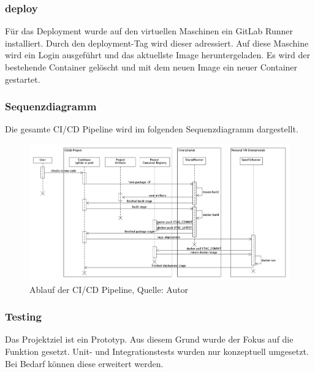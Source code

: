 \subsubsection{deploy}
Für das Deployment wurde auf den virtuellen Maschinen ein GitLab Runner installiert. Durch den deployment-Tag wird dieser adressiert. Auf diese Maschine wird ein Login ausgeführt und das aktuellste Image heruntergeladen. Es wird der bestehende Container gelöscht und mit dem neuen Image ein neuer Container gestartet. 
\newpage
\subsubsection{Sequenzdiagramm}
Die gesamte CI/CD Pipeline wird im folgenden Sequenzdiagramm dargestellt. 
\begin{figure}[H]
	\centering
	\includegraphics[width=1\textwidth]{images/sequenceCicd.png}
	\caption[Ablauf der CI/CD Pipeline]{Ablauf der CI/CD Pipeline, Quelle: Autor}
	\label{img: cicdPipeline}
\end{figure}


\subsubsection{Testing}
Das Projektziel ist ein Prototyp. Aus diesem Grund wurde der Fokus auf die Funktion gesetzt. Unit- und Integrationstests wurden nur konzeptuell umgesetzt. Bei Bedarf können diese erweitert werden. 

\newpage